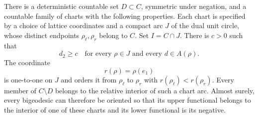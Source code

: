 \begin{lemma}\label{lem:charts}
There is a deterministic countable set $D\subset C$, symmetric under
negation, and a countable family of charts with the following properties.
Each chart is specified by a choice of lattice coordinates and a compact
arc $J$ of the dual unit circle, whose distinct endpoints $\rho_\ell,
\rho_r$ belong to $C$.  Set $I=C\cap J$.  There is $c>0$ such that
\begin{equation}\label{eq:chart-contact-sector}
 d_2\geq c
 \quad\text{for every }\rho\in J\text{ and every }d\in A(\rho).
\end{equation}
The coordinate
\[
 r(\rho)=\rho(e_1)
\]
is one-to-one on $J$ and orders it from $\rho_\ell$ to $\rho_r$ with
$r(\rho_\ell)<r(\rho_r)$.  Every member of $C\setminus D$ belongs to the
relative interior of such a chart arc.  Almost surely, every bigeodesic
can therefore be oriented so that its upper functional belongs to the
interior of one of these charts and its lower functional is its negative.
\end{lemma}

